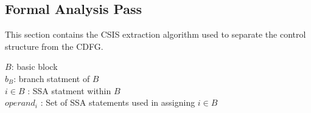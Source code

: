 
\subsection{Formal Analysis Pass}

This section contains the CSIS extraction algorithm used to separate the control structure
from the CDFG.


\noindent $B$: basic block\\
$b_B$: branch statment of $B$\\
$i \in B$ : SSA statment within $B$\\
$operand_i$ : Set of SSA statements used in assigning $i\in B$\\

